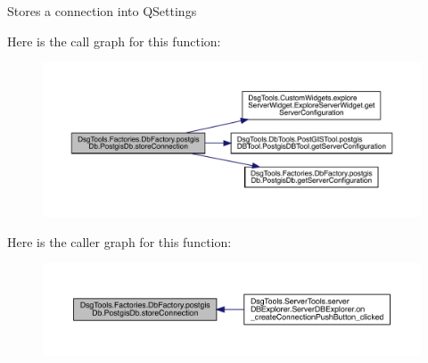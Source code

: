 \begin{DoxyVerb}Stores a connection into QSettings
\end{DoxyVerb}
 Here is the call graph for this function\+:
\nopagebreak
\begin{figure}[H]
\begin{center}
\leavevmode
\includegraphics[width=350pt]{class_dsg_tools_1_1_factories_1_1_db_factory_1_1postgis_db_1_1_postgis_db_a70b28af38ea5fc560b5ce30abee0a5b2_cgraph}
\end{center}
\end{figure}
Here is the caller graph for this function\+:
\nopagebreak
\begin{figure}[H]
\begin{center}
\leavevmode
\includegraphics[width=350pt]{class_dsg_tools_1_1_factories_1_1_db_factory_1_1postgis_db_1_1_postgis_db_a70b28af38ea5fc560b5ce30abee0a5b2_icgraph}
\end{center}
\end{figure}
\mbox{\label{class_dsg_tools_1_1_factories_1_1_db_factory_1_1postgis_db_1_1_postgis_db_abeada3e87837c4fc934994476ff189fb}} 
